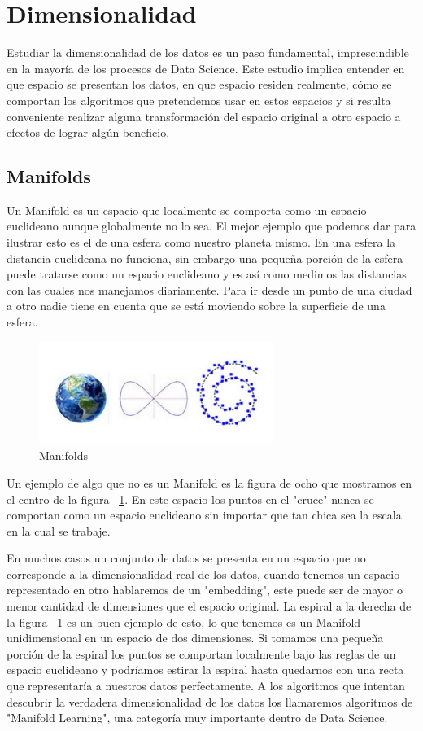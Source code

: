 \section{Dimensionalidad}

Estudiar la dimensionalidad de los datos es un paso fundamental, imprescindible en la mayoría de los procesos de Data Science. Este estudio implica entender en que espacio se presentan los datos, en que espacio residen realmente, cómo se comportan los algoritmos que pretendemos usar en estos espacios y si resulta conveniente realizar alguna transformación del espacio original a otro espacio a efectos de lograr algún beneficio. 

\subsection{Manifolds}
Un Manifold es un espacio que localmente se comporta como un espacio euclideano aunque globalmente no lo sea. El mejor ejemplo que podemos dar para ilustrar esto es el de una esfera como nuestro planeta mismo. En una esfera la distancia euclideana no funciona, sin embargo una pequeña porción de la esfera puede tratarse como un espacio euclideano y es así como medimos las distancias con las cuales nos manejamos diariamente. Para ir desde un punto de una ciudad a otro nadie tiene en cuenta que se está moviendo sobre la superficie de una esfera.

\begin{figure}[!htb]
\centering
\includegraphics[width=3in]{figures/manifolds-fig.png}

\caption{Manifolds}
\label{fig:manifoldocho}
\end{figure}

Un ejemplo de algo que no es un Manifold es la figura de ocho que mostramos en el centro de la figura ~\ref{fig:manifoldocho}. En este espacio los puntos en el "cruce" nunca se comportan como un espacio euclideano sin importar que tan chica sea la escala en la cual se trabaje. 

En muchos casos un conjunto de datos se presenta en un espacio que no corresponde a la dimensionalidad real de los datos, cuando tenemos un espacio representado en otro hablaremos de un "embedding", este puede ser de mayor o menor cantidad de dimensiones que el espacio original. La espiral a la derecha de la figura ~\ref{fig:manifoldocho} es un buen ejemplo de esto, lo que tenemos es un Manifold unidimensional en un espacio de dos dimensiones. Si tomamos una pequeña porción de la espiral los puntos se comportan localmente bajo las reglas de un espacio euclideano y podríamos estirar la espiral hasta quedarnos con una recta que representaría a nuestros datos perfectamente. A los algoritmos que intentan descubrir la verdadera dimensionalidad de los datos los llamaremos algoritmos de "Manifold Learning", una categoría muy importante dentro de Data Science. 

